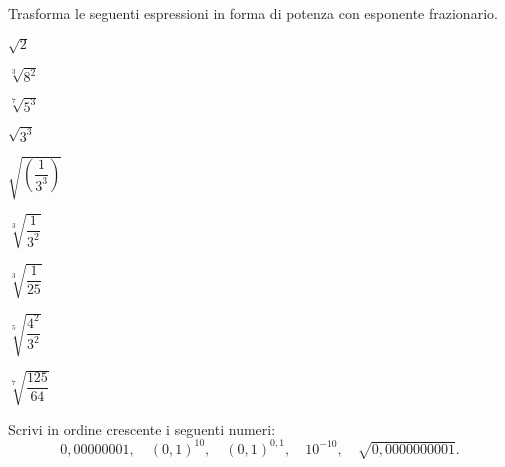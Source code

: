 \begin{esercizio}[\Ast]
 \label{ese:2.18}
Trasforma le seguenti espressioni in forma di potenza con esponente 
frazionario.
\vspace{-.5em}
 \begin{multicols}{4}
 \begin{enumeratea}
 \item $\sqrt 2$
 \item $\sqrt[3]{8^2}$
 \item $\sqrt[7]{5^3}$
 \item $\sqrt{3^3}$
 \item $\sqrt{\left(\dfrac {1}{3^3}\right)}$
 \item $\sqrt[3]{\dfrac {1}{3^2}}$
 \item $\sqrt[3]{\dfrac {1}{25}}$
 \item $\sqrt[5]{\dfrac{4^2}{3^2}}$
 \item $\sqrt[7]{\dfrac {125}{64}}$
 \end{enumeratea}
 \end{multicols}
\end{esercizio}


% 


\begin{esercizio}
 \label{ese:2.20}
Scrivi in ordine crescente i seguenti numeri:
\vspace{-.5em}
 \[0,00000001,\quad (0,1)^{10},\quad (0,1)^{0,1},\quad 10^{-10},
 \quad \sqrt{0,0000000001}.\]
\end{esercizio}

